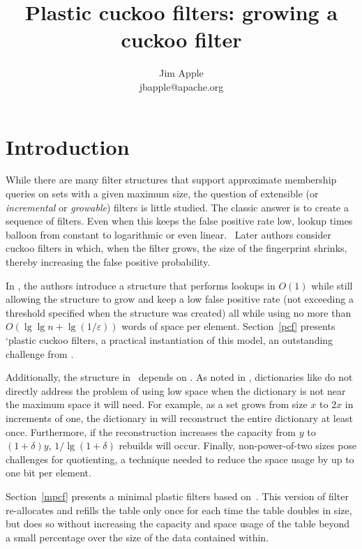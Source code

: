 \documentclass[letterpaper, 11pt]{article}
\begin{document}
\title{Plastic cuckoo filters: growing a cuckoo filter}
\author{Jim Apple \\
  jbapple@apache.org}
\maketitle

\section{Introduction}
While there are many filter structures that support approximate membership queries on sets with a given maximum size, the question of extensible (or {\em incremental} or {\em growable}) filters is little studied.
The classic answer is to create a sequence of filters.
Even when this keeps the false positive rate low, lookup times balloon from constant to logarithmic or even linear.~\cite{psw,logarithm,consistent-cuckoo} %
Later authors consider cuckoo filters in which, when the filter grows, the size of the fingerprint shrinks, thereby increasing the false positive probability.~\cite{logarithm,morton-journal,vacuum,rsqf}

In \cite{psw}, the authors introduce a structure that performs lookups in $O(1)$ while still allowing the structure to grow and keep a low false positive rate (not exceeding a threshold specified when the structure was created) all while using no more than $O(\lg \lg n + \lg (1/\varepsilon))$ words of space per element.
Section~\ref{pcf} presents `plastic cuckoo filters, a practical instantiation of this model, an outstanding challenge from \cite{psw}.

Additionally, the structure in~\cite{psw} depends on \cite{succinct}.
As noted in \cite{dysect}, dictionaries like \cite{succinct} do not directly address the problem of using low space when the dictionary is not near the maximum space it will need.
For example, as a set grows from size $x$ to $2x$ in increments of one, the dictionary in \cite{succinct} will reconstruct the entire dictionary at least once.
Furthermore, if the reconstruction increases the capacity from $y$ to $(1 + \delta)y$, $1/\lg(1+\delta)$ rebuilds will occur.
Finally, non-power-of-two sizes pose challenges for quotienting, a technique needed to reduce the space usage by up to one bit per element.~\cite{change-your-base, cleary-quotient}

Section~\ref{mpcf} presents a minimal plastic filters based on~\cite{dysect}.
This version of filter re-allocates and refills the table only once for each time the table doubles in size, but does so without increasing the capacity and space usage of the table beyond a small percentage over the size of the data contained within.
\end{document}
